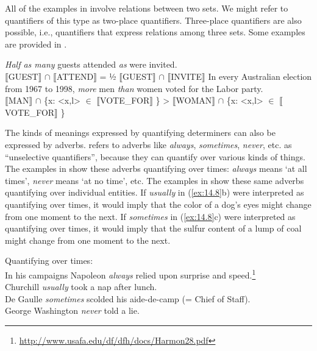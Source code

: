 All of the examples in  involve relations between two sets. We might refer to quantifiers of this type as two-place quantifiers. Three-place quantifiers are also possible, i.e., quantifiers that express relations among three sets. Some examples are provided in .


\ea \label{ex:14.6}
\ea  \textit{Half as many} guests attended \textit{as} were invited.\\
\textsc{{\textbar}} \textsc{$\llbracket$}GUEST$\rrbracket$  ${\cap}$ \textsc{$\llbracket$}ATTEND$\rrbracket$  {\textbar}  =  ½\textsc{{\textbar}} \textsc{$\llbracket$}GUEST$\rrbracket$  ${\cap}$ \textsc{$\llbracket$}INVITE$\rrbracket$  {\textbar}
\ex In every Australian election from 1967 to 1998, \textit{more} men \textit{than} women voted for the Labor party.\\
{\textbar} \textsc{$\llbracket$}MAN$\rrbracket$  ${\cap}$ \{x: <x,l> ${\in}$ $\llbracket$VOTE\_FOR$\rrbracket$ \}{\textbar}  >  {\textbar} \textsc{$\llbracket$WO}MAN$\rrbracket$  ${\cap}$ \{x: <x,l> ${\in}$ $\llbracket$VOTE\_FOR$\rrbracket$ \}{\textbar}
\z \z


The kinds of meanings expressed by quantifying determiners can also be expressed by adverbs. \citet{Lewis1975} refers to adverbs like \textit{always}, \textit{sometimes}, \textit{never}, etc. as “unselective quantifiers”, because they can quantify over various kinds of things. The examples in  show these adverbs quantifying over times: \textit{always} means ‘at all times’, \textit{never} means ‘at no time’, etc. The examples in  show these same adverbs quantifying over individual entities. If \textit{usually} in (\ref{ex:14.8}b) were interpreted as quantifying over times, it would imply that the color of a dog’s eyes might change from one moment to the next. If \textit{sometimes} in (\ref{ex:14.8}c) were interpreted as quantifying over times, it would imply that the sulfur content of a lump of coal might change from one moment to the next.


\ea \label{ex:14.7}
Quantifying over times:\\
\ea In his campaigns Napoleon \textit{always} relied upon surprise and speed.\footnote{\url{http://www.usafa.edu/df/dfh/docs/Harmon28.pdf}} \\
\ex Churchill \textit{usually} took a nap after lunch.\\
\ex De Gaulle \textit{sometimes} scolded his aide-de-camp (= Chief of Staff).\\
\ex George Washington \textit{never} told a lie.
                       \z
\z

